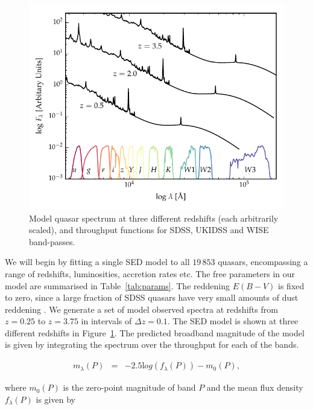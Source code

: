 \begin{figure}
  \centering
  \includegraphics[width=\textwidth]{figures/chapter05/throughput.pdf}
  \caption[{Model quasar spectrum at three different redshifts, and throughput functions for SDSS, UKIDSS and WISE band-passes.}]{Model quasar spectrum at three different redshifts (each arbitrarily scaled), and throughput functions for SDSS, UKIDSS and WISE band-passes.}
  \label{fig:filters}
\end{figure}

We will begin by fitting a single SED model to all $19\,853$ quasars, encompassing a range of redshifts, luminosities, accretion rates etc. 
The free parameters in our model are summarised in Table~\ref{tab:params}. 
The reddening $E(B-V)$ is fixed to zero, since a large fraction of SDSS quasars have very small amounts of dust reddening \citep{richards03}. 
We generate a set of model observed spectra at redshifts from $z=0.25$ to $z=3.75$ in intervals of $\Delta z = 0.1$. 
The SED model is shown at three different redshifts in Figure~\ref{fig:filters}. 
The predicted broadband magnitude of the model is given by integrating the spectrum over the throughput for each of the bands.  

\begin{eqnarray}
  m_\lambda(P) & = & -2.5{\mathrm log}(f_\lambda(P)) - m_0(P), 
\end{eqnarray}

where $m_0(P)$ is the zero-point magnitude of band $P$ and the mean flux density $f_{\lambda}(P)$ is given by 

